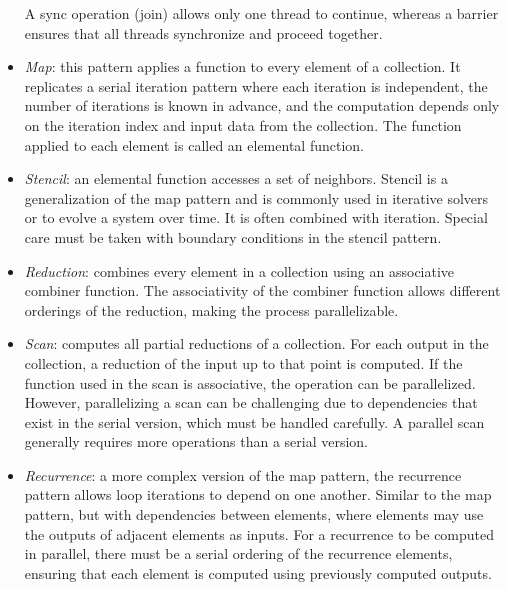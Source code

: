\begin{itemize}
        A sync operation (join) allows only one thread to continue, whereas a barrier ensures that all threads synchronize and proceed together.
    \item \textit{Map}: this pattern applies a function to every element of a collection. 
        It replicates a serial iteration pattern where each iteration is independent, the number of iterations is known in advance, and the computation depends only on the iteration index and input data from the collection. 
        The function applied to each element is called an elemental function.
    \item \textit{Stencil}: an elemental function accesses a set of neighbors.
        Stencil is a generalization of the map pattern and is commonly used in iterative solvers or to evolve a system over time. 
        It is often combined with iteration. 
        Special care must be taken with boundary conditions in the stencil pattern.
    \item \textit{Reduction}: combines every element in a collection using an associative combiner function.
        The associativity of the combiner function allows different orderings of the reduction, making the process parallelizable. 
    \item \textit{Scan}: computes all partial reductions of a collection. 
        For each output in the collection, a reduction of the input up to that point is computed. 
        If the function used in the scan is associative, the operation can be parallelized. 
        However, parallelizing a scan can be challenging due to dependencies that exist in the serial version, which must be handled carefully.
        A parallel scan generally requires more operations than a serial version.
    \item \textit{Recurrence}: a more complex version of the map pattern, the recurrence pattern allows loop iterations to depend on one another. 
        Similar to the map pattern, but with dependencies between elements, where elements may use the outputs of adjacent elements as inputs. 
        For a recurrence to be computed in parallel, there must be a serial ordering of the recurrence elements, ensuring that each element is computed using previously computed outputs.
\end{itemize}

